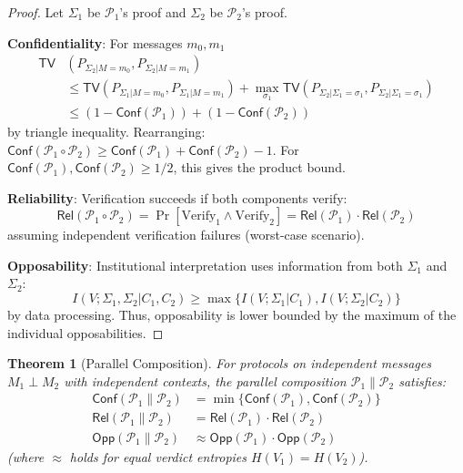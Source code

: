 \documentclass{ieeeaccess}
\newtheorem{theorem}{Theorem}[subsection]
\newtheorem{proof}{Proof}[section]
\begin{document}
\begin{proof}
Let $\Sigma_1$ be $\mathcal{P}_1$'s proof and $\Sigma_2$ be $\mathcal{P}_2$'s proof.

\textbf{Confidentiality}: For messages $m_0, m_1$
\begin{align*}
\mathsf{TV}&(P_{\Sigma_2|M=m_0}, P_{\Sigma_2|M=m_1}) \\
&\leq \mathsf{TV}(P_{\Sigma_1|M=m_0}, P_{\Sigma_1|M=m_1}) + \max_{\sigma_1} \mathsf{TV}(P_{\Sigma_2|\Sigma_1=\sigma_1}, P_{\Sigma_2|\Sigma_1=\sigma_1}) \\
&\leq (1 - \mathsf{Conf}(\mathcal{P}_1)) + (1 - \mathsf{Conf}(\mathcal{P}_2))
\end{align*}
by triangle inequality. Rearranging: $\mathsf{Conf}(\mathcal{P}_1 \circ \mathcal{P}_2) \geq \mathsf{Conf}(\mathcal{P}_1) + \mathsf{Conf}(\mathcal{P}_2) - 1$. For $\mathsf{Conf}(\mathcal{P}_1), \mathsf{Conf}(\mathcal{P}_2) \geq 1/2$, this gives the product bound.

\textbf{Reliability}: Verification succeeds if both components verify:
\begin{equation}
\mathsf{Rel}(\mathcal{P}_1 \circ \mathcal{P}_2) = \Pr[\text{Verify}_1 \land \text{Verify}_2] = \mathsf{Rel}(\mathcal{P}_1) \cdot \mathsf{Rel}(\mathcal{P}_2)
\end{equation}
assuming independent verification failures (worst-case scenario).

\textbf{Opposability}: Institutional interpretation uses information from both $\Sigma_1$ and $\Sigma_2$:
\begin{equation}
I(V;\Sigma_1,\Sigma_2|C_1,C_2) \geq \max\{I(V;\Sigma_1|C_1), I(V;\Sigma_2|C_2)\}
\end{equation}
by data processing. Thus, opposability is lower bounded by the maximum of the individual opposabilities.
\end{proof}

\begin{theorem}[Parallel Composition]\label{thm:parallel_composition}
For protocols on independent messages $M_1 \perp M_2$ with independent contexts, the parallel composition $\mathcal{P}_1 \| \mathcal{P}_2$ satisfies:
\begin{align}
\mathsf{Conf}(\mathcal{P}_1 \| \mathcal{P}_2) &= \min\{\mathsf{Conf}(\mathcal{P}_1), \mathsf{Conf}(\mathcal{P}_2)\} \\
\mathsf{Rel}(\mathcal{P}_1 \| \mathcal{P}_2) &= \mathsf{Rel}(\mathcal{P}_1) \cdot \mathsf{Rel}(\mathcal{P}_2) \\
\mathsf{Opp}(\mathcal{P}_1 \| \mathcal{P}_2) &\approx \mathsf{Opp}(\mathcal{P}_1) \cdot \mathsf{Opp}(\mathcal{P}_2)
\end{align}
(where $\approx$ holds for equal verdict entropies $H(V_1) = H(V_2)$).
\end{theorem}
\end{document}
